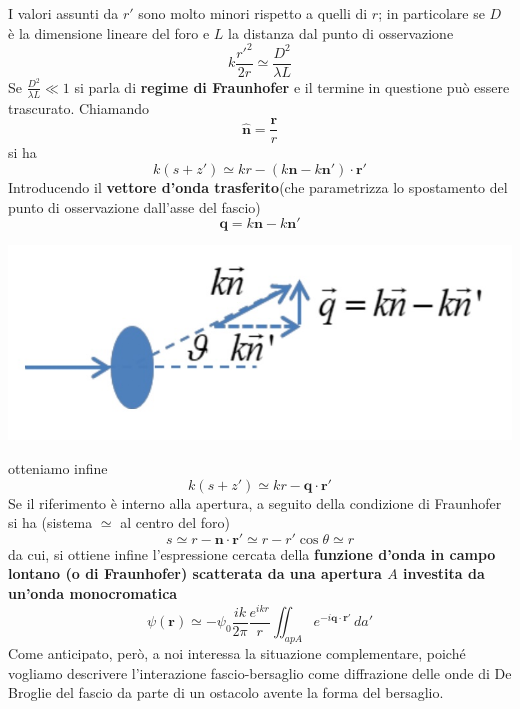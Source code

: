 I valori assunti da \(r'\) sono molto minori rispetto a quelli di
\(r\); in particolare se \(D\) è la dimensione lineare del foro e \(L\) la
distanza dal punto di osservazione
\[
	k \frac{r'^2}{2r} \simeq \frac{D^2}{\lambda L}
\]
Se \(\frac{D^2}{\lambda L} \ll 1\) si parla di \textbf{regime di
Fraunhofer} e il termine in questione può essere trascurato.
Chiamando
\[
    \hat{\bm{n}} = \frac{\bm{r}}{r}
\]
si ha
\[
	k(s+z') \simeq kr - (k \bm{n} - k \bm{n}') \cdot \bm{r}'
\]
Introducendo il \textbf{vettore d'onda trasferito}(che parametrizza
lo spostamento del punto di osservazione dall'asse del fascio)
\[
	\bm{q} = k \bm{n} - k \bm{n}'
\]
\begin{marginfigure}
	\centering
	\includegraphics[width = 1.25 \textwidth, height = 1.25 \textheight]{figs/schema-vett-trasferito}
	\label{fig:vett-trasferito}
\end{marginfigure}
otteniamo infine
\[
	k(s+ z') \simeq kr - \bm{q} \cdot \bm{r}'
\]
Se il riferimento è interno alla apertura, a seguito della condizione
di Fraunhofer si ha (sistema \(\simeq\) al centro del foro)
\[
	s \simeq r - \bm{n} \cdot \bm{r'} \simeq r - r' \cos \theta \simeq r
\]
da cui, si ottiene infine l'espressione cercata della \textbf{funzione
d'onda in campo lontano (o di Fraunhofer) scatterata da una apertura $A$
investita da un'onda monocromatica}
\begin{equation}
	\psi(\bm{r}) \simeq - \psi_0 \frac{ik}{2 \pi} \frac{e^{ikr}}{r}
	\iint_{ap A} e^{-i \bm{q} \cdot \bm{r}'}\, da'
	\label{eq:far-field-scattered-wave}
\end{equation}
Come anticipato, però, a noi interessa la situazione complementare,
poiché vogliamo descrivere l'interazione fascio-bersaglio come
diffrazione delle onde di De Broglie del fascio da parte di un ostacolo
avente la forma del bersaglio.

